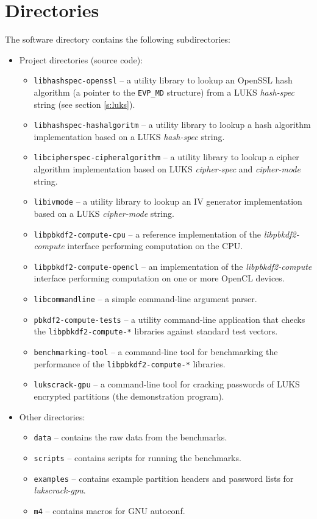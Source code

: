 \documentclass[12pt,oneside]{fithesis2}
\begin{document}
      \section{Directories}
      The software directory contains the following subdirectories:
      \begin{itemize}
        \item Project directories (source code):
        \begin{itemize}
          \item \verb|libhashspec-openssl| -- a utility library to lookup an OpenSSL hash algorithm (a pointer to the \verb|EVP_MD| structure) from a LUKS \emph{hash-spec} string (see section \ref{s:luks}).
          \item \verb|libhashspec-hashalgoritm| -- a utility library to lookup a hash algorithm implementation based on a LUKS \emph{hash-spec} string.
          \item \verb|libcipherspec-cipheralgorithm| -- a utility library to lookup a cipher algorithm implementation based on LUKS \emph{cipher-spec} and \emph{cipher-mode} string.
          \item \verb|libivmode| -- a utility library to lookup an IV generator implementation based on a LUKS \emph{cipher-mode} string.
          \item \verb|libpbkdf2-compute-cpu| -- a reference implementation of the \emph{libpbkdf2-compute} interface performing computation on the CPU.
          \item \verb|libpbkdf2-compute-opencl| -- an implementation of the \emph{libpbkdf2-compute} interface performing computation on one or more OpenCL devices.
          \item \verb|libcommandline| -- a simple command-line argument parser.
          \item \verb|pbkdf2-compute-tests| -- a utility command-line application that checks the \verb|libpbkdf2-compute-*| libraries against standard test vectors.
          \item \verb|benchmarking-tool| -- a command-line tool for benchmarking the performance of the \verb|libpbkdf2-compute-*| libraries.
          \item \verb|lukscrack-gpu| -- a command-line tool for cracking passwords of LUKS encrypted partitions (the demonstration program).
        \end{itemize}
        
        \item Other directories:
        \begin{itemize}
          \item \verb|data| -- contains the raw data from the benchmarks.
          \item \verb|scripts| -- contains scripts for running the benchmarks.
          \item \verb|examples| -- contains example partition headers and password lists for \emph{lukscrack-gpu}.
          \item \verb|m4| -- contains macros for GNU autoconf.
        \end{itemize}
      \end{itemize}
      
\end{document}

